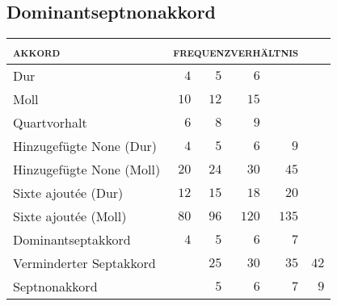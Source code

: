 \subsection{Dominantseptnonakkord}

\begin{table}
	\centering
	\begin{tabular}{lrrrrr}
		\toprule
		\textsc{akkord} & \multicolumn{4}{l}{\textsc{frequenzverhältnis}}\\
		\midrule
		Dur                         & $4$  & $5$  & $6$\\
		Moll                        & $10$ & $12$ & $15$\\
		Quartvorhalt                & $6$  & $8$  & $9$\\
		Hinzugefügte None (Dur)     & $4$  & $5$  & $6$  & $9$\\
		Hinzugefügte None (Moll)    & $20$ & $24$ & $30$ & $45$\\
		Sixte ajoutée (Dur)         & $12$ & $15$ & $18$ & $20$\\
		Sixte ajoutée (Moll)        & $80$ & $96$ & $120$ & $135$\\
		Dominantseptakkord          & $4$  & $5$  & $6$  & $7$\\
		Verminderter Septakkord     &      & $25$ & $30$ & $35$ & $42$\\
		Septnonakkord               &      & $5$  & $6$  & $7$  & $9$\\
		\bottomrule
	\end{tabular}
\end{table}

